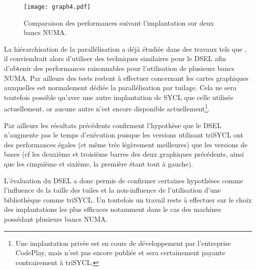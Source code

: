 \begin{figure}[!h]
  \caption{Comparaison des performances suivant l'implantation sur deux bancs NUMA.}
  \label{graph:comp_temps_mistral20core}
  \texttt{[image: graph4.pdf]}
\end{figure}

La hiérarchisation de la parallélisation a déjà étudiée dans des travaux tels que \cite{Ths3,Ths4}, il conviendrait alors d'utiliser des techniques similaires pour le DSEL afin d'obtenir des performances raisonnables pour l'utilisation de plusieurs bancs NUMA. Par ailleurs des tests restent à effectuer concernant les cartes graphiques auxquelles est normalement dédiée la parallélisation par tuilage. Cela ne sera toutefois possible qu'avec une autre implantation de \textsf{SYCL} que celle utilisée actuellement, or aucune autre n'est encore disponible actuellement\footnote{Une implantation privée est en cours de développement par l'entreprise \textsf{CodePlay}, mais n'est pas encore publiée et sera certainement payante contrairement à \textsf{triSYCL}.}.

Par ailleurs les résultats précédents confirment l'hypothèse que le DSEL n'augmente pas le temps d'exécution puisque les versions utilisant \textsf{triSYCL} ont des performances égales (et même très légèrement meilleures) que les versions de bases (cf les deuxième et troisième barres des deux graphiques précédents, ainsi que les cinquième et sixième, la première étant tout à gauche).

L'évaluation du DSEL a donc permis de confirmer certaines hypothèses comme l'influence de la taille des tuiles et la non-influence de l'utilisation d'une bibliothèque comme \textsf{triSYCL}. Un toutefois un travail reste à effectuer sur le choix des implantations les plus efficaces notamment dans le cas des machines possédant plusieurs bancs NUMA.
